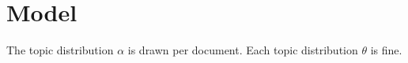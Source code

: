 \section{Model}
The topic distribution $\alpha$ is drawn per document.
Each topic distribution $\theta$ is fine.

